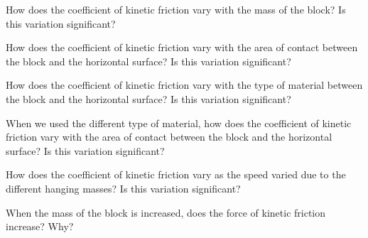 \documentclass[main.tex]{subfiles}
\begin{document}
\begin{question}
How does the coefficient of kinetic friction vary with the mass of the block? Is this variation significant? %
\end{question}
\begin{question}
How does the coefficient of kinetic friction vary with the area of contact between the block and the horizontal surface? Is this variation significant?
\end{question}
\begin{question}
How does the coefficient of kinetic friction vary with the type of material between the block and the horizontal surface? Is this variation significant?
\end{question}
\begin{question}
When we used the different type of material, how does the coefficient of kinetic friction vary with the area of contact between the block and the horizontal surface? Is this variation significant?
\end{question}
\begin{question}
How does the coefficient of kinetic friction vary as the speed varied due to the different hanging masses? Is this variation significant?
\end{question}
\begin{question}
When the mass of the block is increased, does the force of kinetic friction increase? Why?
\end{question}
\end{document}
